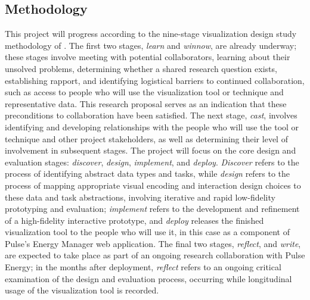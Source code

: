 \subsection{Methodology}
\label{app:emu:proposal-methodology}

This project will progress according to the nine-stage visualization design study methodology of \citet{Sedlmair2012}. 
The first two stages, {\it learn} and {\it winnow}, are already underway; these stages involve meeting with potential collaborators, learning about their unsolved problems, determining whether a shared research question exists, establishing rapport, and identifying logistical barriers to continued collaboration, such as access to people who will use the visualization tool or technique and representative data. 
This research proposal serves as an indication that these preconditions to collaboration have been satisfied. 
The next stage, {\it cast}, involves identifying and developing relationships with the people who will use the tool or technique and other project stakeholders, as well as determining their level of involvement in subsequent stages. 
The project will focus on the core design and evaluation stages: {\it discover}, {\it design}, {\it implement}, and {\it deploy}. 
{\it Discover} refers to the process of identifying abstract data types and tasks, while {\it design} refers to the process of mapping appropriate visual encoding and interaction design choices to these data and task abstractions, involving iterative and rapid low-fidelity prototyping and evaluation; {\it implement} refers to the development and refinement of a high-fidelity interactive prototype, and {\it deploy} releases the finished visualization tool to the people who will use it, in this case as a component of Pulse's Energy Manager web application. 
The final two stages, {\it reflect}, and {\it write}, are expected to take place as part of an ongoing research collaboration with Pulse Energy; in the months after deployment, {\it reflect} refers to an ongoing critical examination of the design and evaluation process, occurring while longitudinal usage of the visualization tool is recorded.
